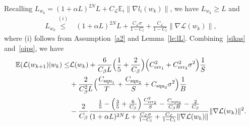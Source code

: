 \documentclass{osudissert96}
\begin{document}
	Recalling {$L_{w_k} = (1+\alpha L)^{2N}L + C_\mathcal{L} \mathbb{E}_{i}\|\nabla l_i(w_k)\|$}, we have  $ L_{w_k} \geq L$ and 
	\begin{align}\label{oips}
	L_{w_k} %
	 \overset{(i)}\leq &  (1+\alpha L)^{2N}L + \frac{C_\mathcal{L}\sigma}{1-C_l}+ \frac{C_\mathcal{L}}{1-C_l} \|\nabla \mathcal{L}(w_k)\|,  
	\end{align}
	where (i) follows from Assumption~\ref{a2} and Lemma~\ref{le:lL}. 
	Combining~\cref{sikas} and~\cref{oips}, we have 
	\begin{align}\label{miops}
	\mathbb{E}( \mathcal{L}(w_{k+1})| w_k) \leq& \mathcal{L}(w_{k}) + \frac{6}{C_\beta L}\Big( \frac{1}{5} +\frac{2}{C_\beta}   \Big)\Big( C^2_{{\text{\normalfont err}}_1} +C^2_{{\text{\normalfont err}}_2}\sigma^2\Big) \frac{1}{S} \nonumber
	\\&+  \frac{2}{C_\beta^2 L} \Big(  \frac{C_{\text{\normalfont squ}_1}}{T}  +  \frac{C_{\text{\normalfont squ}_2}}{S} + C_{\text{\normalfont squ}_3} \sigma^2 \Big) \frac{1}{B} \nonumber
	\\ &	- \frac{2}{C_\beta } \frac{ \frac{1}{5} - \left(\frac{3}{5} + \frac{6}{C_\beta}\right)\frac{C^2_{{\text{\normalfont err}}_2} }{S} - \frac{C_{\text{\normalfont squ}_3}}{C_\beta B} - \frac{2}{C_\beta}}{(1+\alpha L)^{2N}L + \frac{C_\mathcal{L}\sigma}{1-C_l}+ \frac{C_\mathcal{L}}{1-C_l} \|\nabla \mathcal{L}(w_k)\|} \|\nabla \mathcal{L}(w_k) \|^2.
	\end{align}
\end{document}
